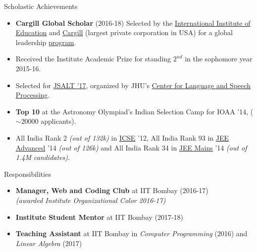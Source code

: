 \documentclass{resume} %
\begin{document}
\vspace*{-1.5mm}
\begin{rSection}{Scholastic Achievements}
\begin{itemize}[leftmargin=*]
\itemsep -0.5em 
\item \textbf{Cargill Global Scholar} (2016-18) Selected by the \href{https://en.wikipedia.org/wiki/Institute_of_International_Education}{International Institute of Education} and \href{https://en.wikipedia.org/wiki/Cargill}{Cargill} (largest private corporation in USA) for a global leadership \href{https://www.cargillglobalscholars.com/}{program}.
\item Received the Institute Academic Prize for standing $2^{nd}$ in the  sophomore year 2015-16.
\item Selected for \href{https://www.lti.cs.cmu.edu/2017-jsalt-undergraduate}{JSALT '17}, organized by JHU's \href{https://www.clsp.jhu.edu/}{Center for Language and Speech Processing}\footnotemark[2]. 
\item \textbf{Top 10} at the Astronomy Olympiad's Indian Selection Camp for IOAA '14, ($\sim$20000 applicants).
\item All India Rank 2 \textit{(out of 132k)} in \href{https://en.wikipedia.org/wiki/Indian_Certificate_of_Secondary_Education}{ICSE} '12, All India Rank 93 in \href{https://en.wikipedia.org/wiki/Joint_Entrance_Examination}{JEE Advanced} '14 \textit{(out of 126k)} and All India Rank 34 in \href{https://en.wikipedia.org/wiki/Joint_Entrance_Examination}{JEE Mains} '14 \textit{(out of 1.4M candidates)}.
\end{itemize}
\end{rSection}
\vspace*{-1.5mm}
\begin{rSection}{Responsibilities}
\begin{itemize}[leftmargin=*]
\itemsep -0.5em 
\item \textbf{Manager, Web and Coding Club} at IIT Bombay (2016-17)\\ \textit{(awarded Institute Organizational Color 2016-17)}
\item \textbf{Institute Student Mentor} at IIT Bombay (2017-18)
\item \textbf{Teaching Assistant} at IIT Bombay in \textit{Computer Programming} (2016) and \textit{Linear Algebra} (2017)
\end{itemize}
\end{rSection}
\end{document}
